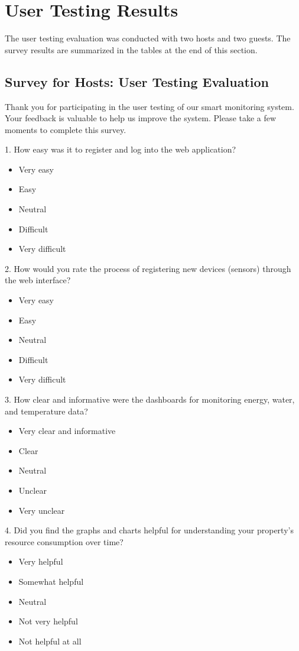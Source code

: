 \section{User Testing Results}

The user testing evaluation was conducted with two hosts and two guests. The survey results are summarized in the
tables at the end of this section.

\subsection{Survey for Hosts: User Testing Evaluation}

Thank you for participating in the user testing of our smart monitoring system. Your feedback is valuable to help us 
improve the system. Please take a few moments to complete this survey.

1. How easy was it to register and log into the web application?
\begin{itemize}[label=\Square]
    \item Very easy
    \item Easy
    \item Neutral
    \item Difficult
    \item Very difficult
\end{itemize}

2. How would you rate the process of registering new devices (sensors) through the web interface?
\begin{itemize}[label=\Square]
    \item Very easy
    \item Easy
    \item Neutral
    \item Difficult
    \item Very difficult
\end{itemize}

3. How clear and informative were the dashboards for monitoring energy, water, and temperature data?
\begin{itemize}[label=\Square]
    \item Very clear and informative
    \item Clear
    \item Neutral
    \item Unclear
    \item Very unclear
\end{itemize}

4.  Did you find the graphs and charts helpful for understanding your property’s resource consumption over time?
\begin{itemize}[label=\Square]
    \item Very helpful
    \item Somewhat helpful
    \item Neutral
    \item Not very helpful
    \item Not helpful at all
\end{itemize}

